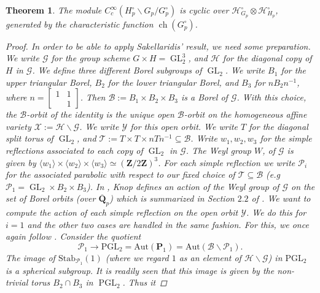 \documentclass{amsart}%
\theoremstyle{plain}
\newtheorem{thm}{Theorem}[subsection]
\theoremstyle{plain}
\theoremstyle{remark}
\DeclareMathOperator{\GL}{GL}
\DeclareMathOperator{\ch}{ch}
\DeclareMathOperator{\PGL}{PGL}
\begin{document}
\begin{thm}\label{cyclicity via sakellaridis}
    The module $C_c^\infty(H_p^\circ\backslash G_p/G_p^\circ)$ is cyclic over $\mathcal{H}_{G_p}^\circ\otimes \mathcal{H}_{H_p}^\circ$, generated by the characteristic function $\ch(G_p^\circ)$.
    \begin{proof}
        In order to be able to apply Sakellaridis' result, we need some preparation. We write $\mathscr{G}$ for the group scheme $G\times H=\GL_2^3$, and $\mathscr{H}$ for the diagonal copy of $H$ in $\mathscr{G}$. We define three different Borel subgroups of $\GL_2$. We write $B_1$ for the upper triangular Borel, $B_2$ for the lower triangular Borel, and $B_3$ for $nB_2n^{-1}$, where $n=\left[\begin{smallmatrix}
            1 & 1 \\
            & 1
        \end{smallmatrix}\right]$. Then $\mathscr{B}:=B_1\times B_2\times B_3$ is a Borel of $\mathscr{G}$. With this choice, the $\mathscr{B}$-orbit of the identity is the unique open $\mathscr{B}$-orbit on the homogeneous affine variety $\mathcal{X}:=\mathscr{H}\backslash \mathscr{G}$. We write $\mathcal{Y}$ for this open orbit. We write $T$ for the diagonal split torus of $\GL_2$, and $\mathscr{T}:=T\times T\times nTn^{-1}\subseteq\mathscr{B}$. Write $w_1,w_2,w_3$ for the simple reflections associated to each copy of $\GL_2$ in $\mathscr{G}$. The Weyl group $W$, of $\mathscr{G}$ is given by $\langle w_1\rangle \times \langle w_2\rangle\times  \langle w_3\rangle\simeq (\mathbf{Z}/2\mathbf{Z})^3$. For each simple reflection we write $\mathscr{P}_i$ for the associated parabolic with respect to our fixed choice of $\mathscr{T}\subseteq \mathscr{B}$ (e.g $\mathscr{P}_1=\GL_2\times B_2\times B_3$). In \cite{knop1995set}, Knop defines an action of the Weyl group of $\mathscr{G}$ on the set of Borel orbits (over $\overline{\mathbf{Q}}_p$) which is summarized in Section $2.2$ of \cite{Sakellaridis_2008}. We want to compute the action of each simple reflection on the open orbit $\mathcal{Y}$. We do this for $i=1$ and the other two cases are handled in the same fashion. For this, we once again follow \cite[\S $2.2$]{Sakellaridis_2008}. Consider the quotient 
        $$\mathscr{P}_1\rightarrow \mathrm{PGL}_2=\mathrm{Aut}(\mathbf{P}_1)=\mathrm{Aut}(\mathscr{B}\backslash\mathscr{P}_1).$$
        The image of $\mathrm{Stab}_{\mathscr{P}_1}(1)$ (where we regard $1$ as an element of $\mathscr{H}\backslash\mathscr{G}$) in $\mathrm{PGL}_2$ is a spherical subgroup. It is readily seen that this image is given by the non-trivial torus $B_2\cap B_3$ in $\PGL_2$. Thus it

\end{proof}
\end{thm}
\end{document}
